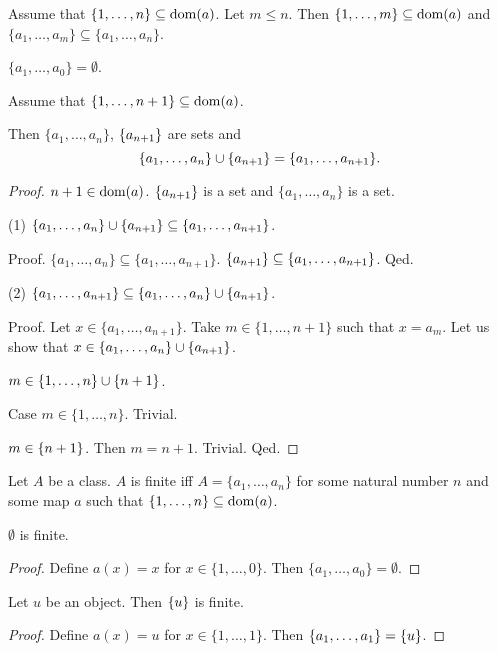 \documentclass[english,11pt]{article}
\newcommand{\Seq}[2]{\{#1,\dots,#2\}}
\newcommand{\FinSet}[3]{\{#1_{#2},\dots,#1_{#3}\}}
\begin{document}
\begin{forthel}
\begin{lemma}
Assume that $\Seq{1}{n} \subseteq \dom(a)$.
Let $m \leq n$. Then $\Seq{1}{m} \subseteq \dom(a)$ and
$\FinSet{a}{1}{m} \subseteq \FinSet{a}{1}{n}$.
\end{lemma}

\begin{lemma}
$\FinSet{a}{1}{0} = \emptyset$.
\end{lemma}

\begin{lemma}
Assume that $\Seq{1}{n+1} \subseteq \dom(a)$. 

Then
$\FinSet{a}{1}{n}$, $\{a_{n+1}\}$ are sets and
\[\FinSet{a}{1}{n} \cup \sing{a_{n+1}} = \FinSet{a}{1}{n+1}.\]
\end{lemma}
\begin{proof}
$n+1 \in \operatorname{dom}(a)$.
$\{a_{n+1}\}$ is a set and $\FinSet{a}{1}{n}$ is a set.

(1) $\FinSet{a}{1}{n} \cup \sing{a_{n+1}} \subseteq \FinSet{a}{1}{n+1}$.

Proof.
$\FinSet{a}{1}{n} \subseteq \FinSet{a}{1}{n+1}$.
$\sing{a_{n+1}}  \subseteq \FinSet{a}{1}{n+1}$.
Qed.

(2) $\FinSet{a}{1}{n+1} \subseteq \FinSet{a}{1}{n} \cup \sing{a_{n+1}}$.

Proof.
Let $x \in \FinSet{a}{1}{n+1}$. Take $m \in \Seq{1}{n+1}$ such that
$x = a_{m}$. Let us show that $x \in \FinSet{a}{1}{n} \cup \sing{a_{n+1}}$.

$m \in \Seq{1}{n} \cup \sing{n+1}$.

Case $m \in \Seq{1}{n}$. Trivial.

$m \in \{n+1\}$. Then $m = n+1$. Trivial.
Qed.

\end{proof}

\begin{definition} Let $A$ be a class.
$A$ is finite iff
$A = \FinSet{a}{1}{n}$ for some natural number $n$ and some map $a$ such 
that $\Seq{1}{n} \subseteq \dom(a)$.
\end{definition}

\begin{lemma}
$\emptyset$ is finite.
\end{lemma}
\begin{proof}
Define $a(x) = x$ for $x \in \Seq{1}{0}$.
Then $\FinSet{a}{1}{0} = \emptyset$.
\end{proof}

\begin{lemma}
Let $u$ be an object. Then
$\{u\}$ is finite.
\end{lemma}
\begin{proof}
Define $a(x) = u$ for $x \in \Seq{1}{1}$.
Then $\FinSet{a}{1}{1} = \sing{u}$. 
\end{proof}


\end{forthel}
\end{document}
